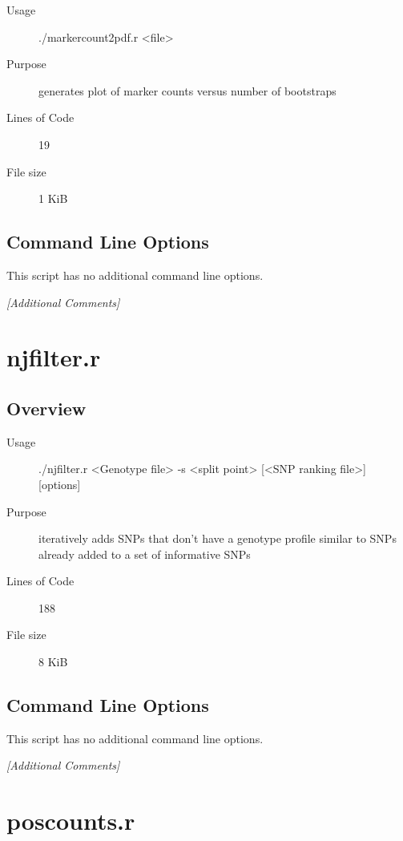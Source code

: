 \begin{description}
\item[Usage] ./markercount2pdf.r <file>
\item[Purpose] generates plot of marker counts versus number of bootstraps
\item[Lines of Code] 19
\item[File size] 1 KiB
\end{description}

\subsection{Command Line Options}
\label{sec:markercount2pdf.r-command-line}

This script has no additional command line options.

\emph{[Additional Comments]}

\section{njfilter.r}
\label{sec:njfilter.r}

\subsection{Overview}
\label{sec:njfilter.r-overview}

\begin{description}
\item[Usage] ./njfilter.r <Genotype file> -s <split point> [<SNP ranking file>] [options]
\item[Purpose] iteratively adds SNPs that don't have a genotype profile similar to SNPs already added to a set of informative SNPs
\item[Lines of Code] 188
\item[File size] 8 KiB
\end{description}

\subsection{Command Line Options}
\label{sec:njfilter.r-command-line}

This script has no additional command line options.

\emph{[Additional Comments]}

\section{poscounts.r}
\label{sec:poscounts.r}


